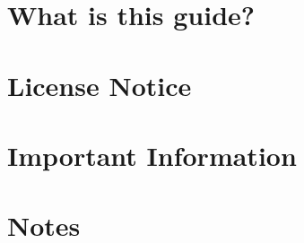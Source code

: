 \documentclass[../main.tex]{subfiles}
\begin{document}
\section*{What is this guide?}
\label{what-is-this-guide}


\newpage
\section*{License Notice}
\label{license-notice}


\newpage
\section*{Important Information}
\label{important-information}


\newpage
\section*{Notes}
\label{notes}

\end{document}
